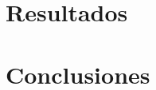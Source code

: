 \documentclass[a4paper, 12pt]{book}
\begin{document}

\cleardoublepage
\chapter{Resultados}
\label{chap:resultados}




\cleardoublepage
\chapter{Conclusiones}
\label{chap:conclusiones}
\end{document}

